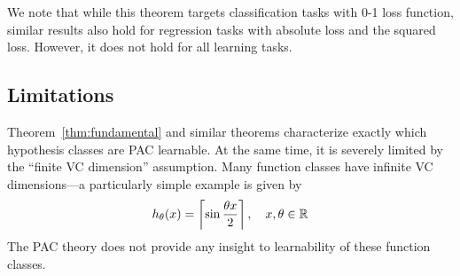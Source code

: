 We note that while this theorem targets classification tasks with 0-1 loss
function, similar results also hold for regression tasks with absolute loss and
the squared loss. However, it does not hold for all learning tasks.

\subsection{Limitations}

Theorem~\ref{thm:fundamental} and similar theorems characterize exactly which
hypothesis classes are PAC learnable. At the same time, it is severely limited
by the ``finite VC dimension'' assumption. Many function classes have infinite
VC dimensions---a particularly simple example is given by
\begin{equation}
  h_\theta(x) = \left\lceil \sin\frac{\theta x}{2} \right\rceil, \quad x, \theta
  \in \mathbb{R}
\end{equation}
The PAC theory does not provide any insight to learnability of these function
classes.
